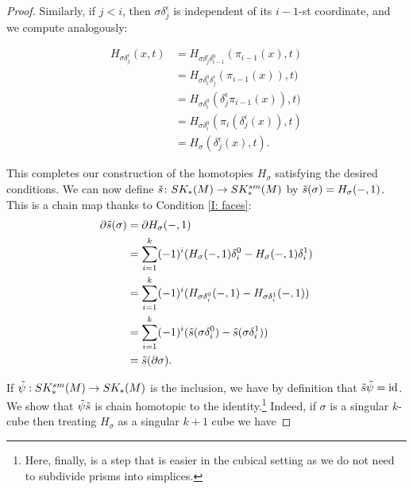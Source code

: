 \begin{proof}
	Similarly, if $j<i$, then $\sigma\delta_j^\epsilon$ is independent of its $i-1$-st coordinate, and we compute analogously:

	\begin{align*}
		H_{\sigma\delta_j^\epsilon}(x,t)& = H_{\sigma\delta_j^\epsilon \delta_{i-1}^0}(\pi_{i-1}(x),t)\\
		& = H_{\sigma \delta_{i}^0\delta_{j}^\epsilon}(\pi_{i-1}(x)),t)\\
		& = H_{\sigma \delta_{i}^0}(\delta_{j}^\epsilon\pi_{i-1}(x)),t)\\
		& = H_{\sigma \delta_{i}^0}(\pi_{i}(\delta_j^\epsilon(x)),t)\\
		& = H_\sigma(\delta_j^\epsilon(x),t).
	\end{align*}

	This completes our construction of the homotopies $H_\sigma$ satisfying the desired conditions.
	We can now define $\tilde s \colon SK_*(M) \to SK^{sm}_*(M)$ by $\tilde s(\sigma) = H_\sigma(-,1)$.
	This is a chain map thanks to Condition \eqref{I: faces}:
	\begin{align*}
	\partial \tilde s(\sigma) &= \partial H_\sigma(-,1)\\
	&=\sum_{i=1}^k (-1)^i (H_\sigma(-,1) \delta_i^0 - H_\sigma(-,1) \delta_i^1)\\
	&=\sum_{i=1}^k (-1)^i (H_{\sigma \delta_i^0}(-,1) - H_{\sigma \delta_i^1}(-,1))\\
	&=\sum_{i=1}^k (-1)^i (\tilde s(\sigma \delta_i^0) - \tilde s(\sigma \delta_i^1))\\
	&= \tilde s(\partial \sigma).
	\end{align*}

	If $\tilde \psi: SK_*^{sm}(M) \to SK_*(M)$ is the inclusion, we have by definition that $\tilde s \tilde \psi = \mathrm{id}$.
	We show that $\tilde\psi\tilde s$ is chain homotopic to the identity.\footnote{Here, finally, is a step that is easier in the cubical setting as we do not need to subdivide prisms into simplices.}
	Indeed, if $\sigma$ is a singular $k$-cube then treating $H_\sigma$ as a singular $k+1$ cube we have


\end{proof}
